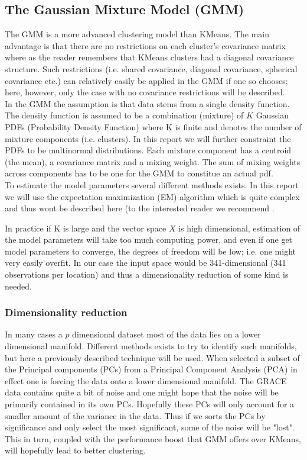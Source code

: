 \subsection{The Gaussian Mixture Model (GMM)}

The GMM is a more advanced clustering model than KMeans. 
The main advantage is that there are no restrictions on each cluster's covariance matrix where as the reader remembers that KMeans clusters had a diagonal covariance structure. 
Such restrictions (i.e. shared covariance, diagonal covariance, spherical covariance etc.) can relatively easily be applied in the GMM if one so chooses; here, however, only the case with no covariance restrictions will be described.
\\
In the GMM the assumption is that data stems from a single density function.
The density function is assumed to be a combination (mixture) of $K$ Gaussian PDFs (Probability Density Function) where K is finite and denotes the number of mixture components (i.e. clusters).
In this report we will further constraint the PDFs to be multinormal distributions.
Each mixture component has a centroid (the mean), a covariance matrix and a mixing weight.
The sum of mixing weights across components has to be one for the GMM to constitue an actual pdf.
\\
To estimate the model parameters several different methods exists. In this report we will use the expectation maximization (EM) algorithm which is quite complex and thus wont be described here (to the interested reader we recommend \cite[p.~214,272,463]{statistical-learning}.



In practice if K is large and the vector space $X$ is high dimensional, estimation of the model parameters will take too much computing power, and even if one get model parameters to converge, the degrees of freedom will be low; i.e. one might very easily overfit.
In our case the input space would be 341-dimensional (341 observations per location) and thus a dimensionality reduction of some kind is needed. 

\subsubsection{Dimensionality reduction}
In many cases a $p$ dimensional dataset most of the data lies on a lower dimensional manifold. 
Different methods exists to try to identify such manifolds, but here a previously described technique will be used. 
When selected a subset of the Principal components (PCs) from a Principal Component Analysis (PCA) in effect one is forcing the data onto a lower dimensional manifold.
The GRACE data contains quite a bit of noise and one might hope that the noise will be primarily contained in its own PCs. Hopefully these PCs will only account for a smaller amount of the variance in the data. 
Thus if we sorts the PCs by significance and only select the most significant, some of the noise will be "lost".
This in turn, coupled with the performance boost that GMM offers over KMeans, will hopefully lead to better clustering.